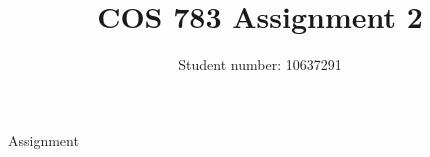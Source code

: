 \documentclass[a4paper,oneside,landscape,12pt]{article}
\title{\large\bfseries COS 783 Assignment 2}
\author{\large Student number: 10637291 }
\date{}
\begin{document}
\maketitle
{Assignment}
\end{document}
